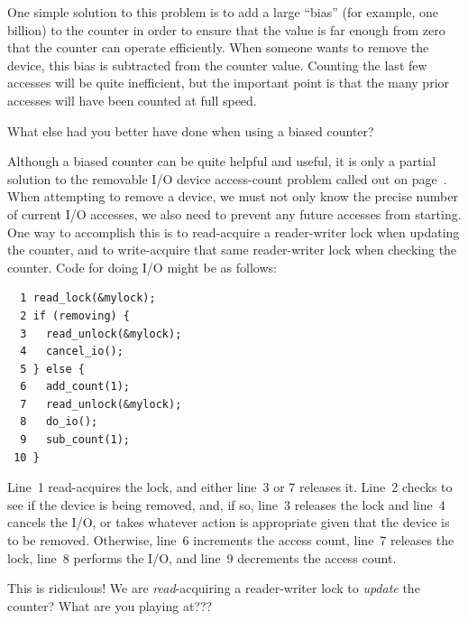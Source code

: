One simple solution to this problem is to add a large ``bias''
(for example, one billion) to the
counter in order to ensure that the value is far enough from zero that
the counter can operate efficiently.
When someone wants to remove the device, this bias is subtracted from
the counter value.
Counting the last few accesses will be quite inefficient,
but the important point is that the many prior accesses will have been
counted at full speed.

\QuickQuiz{}
	What else had you better have done when using a biased counter?
 \QuickQuizEnd

Although a biased counter can be quite helpful and useful, it is only a
partial solution to the removable I/O device access-count problem
called out on
page~\pageref{chp:Counting}.
When attempting to remove a device, we must not only know the precise
number of current I/O accesses, we also need to prevent any future
accesses from starting.
One way to accomplish this is to read-acquire a reader-writer lock
when updating the counter, and to write-acquire that same reader-writer
lock when checking the counter.
Code for doing I/O might be as follows:

\vspace{5pt}
\begin{minipage}[t]{\columnwidth}
\small
\begin{verbatim}
  1 read_lock(&mylock);
  2 if (removing) {
  3   read_unlock(&mylock);
  4   cancel_io();
  5 } else {
  6   add_count(1);
  7   read_unlock(&mylock);
  8   do_io();
  9   sub_count(1);
 10 }
\end{verbatim}
\end{minipage}
\vspace{5pt}

Line~1 read-acquires the lock, and either line~3 or 7 releases it.
Line~2 checks to see if the device is being removed, and, if so,
line~3 releases the lock and line~4 cancels the I/O, or takes whatever
action is appropriate given that the device is to be removed.
Otherwise, line~6 increments the access count, line~7 releases the
lock, line~8 performs the I/O, and line~9 decrements the access count.

\QuickQuiz{}
	This is ridiculous!
	We are \emph{read}-acquiring a reader-writer lock to
	\emph{update} the counter?
	What are you playing at???
 \QuickQuizEnd

